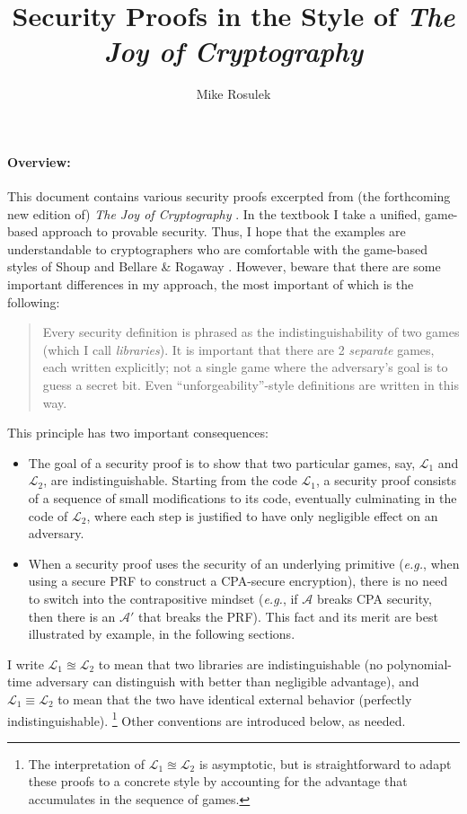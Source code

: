 \documentclass[11pt,letterpaper]{article}
\newcommand{\eg}{\textsl{e.g.}}
\renewcommand{\L}{\mathcal{L}}
\newcommand{\indist}{\approxeq}
\newcommand{\A}{\mathcal{A}}
\renewcommand{\L}{\mathcal{L}}
\begin{document}
\title{Security Proofs in the Style of \emph{The Joy of Cryptography}}
\author{Mike Rosulek}
\maketitle


\paragraph{Overview:}

This document contains various security proofs excerpted from (the forthcoming new edition of) \emph{The Joy of Cryptography} \cite{joyofcryptography}.
In the textbook I take a unified, game-based approach to provable security.
Thus, I hope that the examples are understandable to cryptographers who are comfortable with the game-based styles of Shoup \cite{EPRINT:Shoup04} and Bellare \& Rogaway \cite{EC:BelRog06}.
However, beware that there are some important differences in my approach, the most important of which is the following:
\begin{quote}
        Every security definition is phrased as the indistinguishability of two games (which I call \emph{libraries}).
        It is important that there are 2 \emph{separate} games, each written explicitly; not a single game where the adversary's goal is to guess a secret bit.
        Even ``unforgeability''-style definitions are written in this way.
\end{quote}
This principle has two important consequences:
\begin{itemize}
    \item 
        The goal of a security proof is to show that two particular games, say, $\L_1$ and $\L_2$, are indistinguishable.
        Starting from the code $\L_1$, a security proof consists of a sequence of small modifications to its code, eventually culminating in the code of $\L_2$, where each step is justified to have only negligible effect on an adversary.

    \item
        When a security proof uses the security of an underlying primitive (\eg, when using a secure PRF to construct a CPA-secure encryption), there is no need to switch into the contrapositive mindset (\eg, if $\A$ breaks CPA security, then there is an $\A'$ that breaks the PRF).
        This fact and its merit are best illustrated by example, in the following sections.
\end{itemize}
I write $\L_1 \indist \L_2$ to mean that two libraries are indistinguishable (no polynomial-time adversary can distinguish with better than negligible advantage), and $\L_1 \equiv \L_2$ to mean that the two have identical external behavior (perfectly indistinguishable).%
\footnote{The interpretation of $\L_1 \indist \L_2$ is asymptotic, but is straightforward to adapt these proofs to a concrete style by accounting for the advantage that accumulates in the sequence of games.}
Other conventions are introduced below, as needed.
\end{document}
